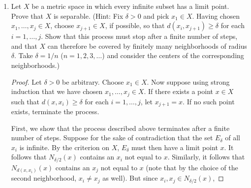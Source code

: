 \documentclass[../psets.tex]{subfiles}
\begin{document}
\begin{enumerate}[label={\textbf{\arabic*.}}]
\begin{proof}
        \begin{equation*}
            f[N_q(e)] = (q,e)
        \end{equation*}
        implies that $\{N_q(e)\}_{e\in E,\ q\in\Q^+}$ is countable.\par
        Now all we need to do is show that $\{N_q(e)\}_{e\in E,\ q\in\Q^+}$ is a base of $X$. First off, $\{N_q(e)\}_{e\in E,\ q\in\Q^+}$ is a collection of open subsets of $X$ by the definition of each neighborhood and the fact that neighborhoods are open (Theorem 2.19). Additionally, let $x\in X$ be arbitrary and let $G\subset X$ be an arbitrary open set containing $x$. Since $G$ is open, there exists a neighborhood $N_r(x)$ such that $N_r(x)\subset G$. Since $E$ is dense in $X$, $x$ is a limit point of $E$. Thus, there exists $e\in E$ such that $e\in N_{r/3}(x)$. Thus, choose $q\in\Q^+$ such that $r/3<q<2r/3$. It follows that
        \begin{equation*}
            x\in N_{r/3}(e)
            \subset N_q(e)
            \subset N_{2r/3}(e)
            \subset N_r(x)
            \subset G
        \end{equation*}
        as desired.
    \end{proof}
    \item Let $X$ be a metric space in which every infinite subset has a limit point. Prove that $X$ is separable. (Hint: Fix $\delta>0$ and pick $x_1\in X$. Having chosen $x_1,\dots,x_j\in X$, choose $x_{j+1}\in X$, if possible, so that $d(x_i,x_{j+1})\geq\delta$ for each $i=1,\dots,j$. Show that this process must stop after a finite number of steps, and that $X$ can therefore be covered by finitely many neighborhoods of radius $\delta$. Take $\delta=1/n$ ($n=1,2,3,\dots$) and consider the centers of the corresponding neighborhoods.)
    \begin{proof}
        Let $\delta>0$ be arbitrary. Choose $x_1\in X$. Now suppose using strong induction that we have chosen $x_1,\dots,x_j\in X$. If there exists a point $x\in X$ such that $d(x,x_i)\geq\delta$ for each $i=1,\dots,j$, let $x_{j+1}=x$. If no such point exists, terminate the process.\par
        First, we show that the process described above terminates after a finite number of steps. Suppose for the sake of contradiction that the set $E_\delta$ of all $x_i$ is infinite. By the criterion on $X$, $E_\delta$ must then have a limit point $x$. It follows that $N_{\delta/2}(x)$ contains an $x_i$ not equal to $x$. Similarly, it follows that $N_{d(x,x_i)}(x)$ contains an $x_j$ not equal to $x$ (note that by the choice of the second neighborhood, $x_i\neq x_j$ as well). But since $x_i,x_j\in N_{\delta/2}(x)$,

\end{proof}
\end{enumerate}
\end{document}

